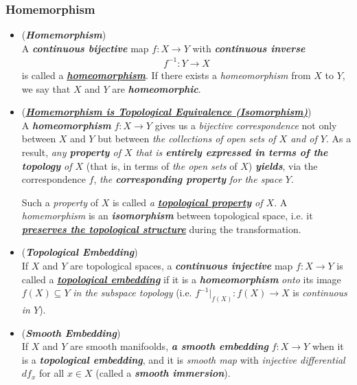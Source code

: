 \documentclass[11pt]{article}
\begin{document}
\subsubsection{Homemorphism}
\begin{itemize}
\item \begin{definition} (\textbf{\emph{Homemorphism}})\\
A \emph{\textbf{continuous bijective}} map $f: X \rightarrow Y$ with \emph{\textbf{continuous inverse}} 
\begin{align*}
f^{-1}: Y \rightarrow X
\end{align*}
is called a \underline{\emph{\textbf{homeomorphism}}}. If there exists a \emph{homeomorphism} from $X$ to $Y$, we say that $X$ and $Y$ are \emph{\textbf{homeomorphic}}.
\end{definition}

\item  \begin{remark} (\underline{\emph{\textbf{Homemorphism is Topological Equivalence (Isomorphism)}}})\\
A \emph{\textbf{homeomorphism}} $f : X \rightarrow Y$ gives us a \emph{bijective  correspondence} not only between $X$ and $Y$ but between \emph{the collections of open sets of $X$ and of $Y$}. As a result, \emph{any \textbf{property} of $X$ that is \textbf{entirely expressed in terms of the  topology} of $X$} (that is, in terms of \emph{the open sets} of $X$) \emph{\textbf{yields}}, via the correspondence $f$, \emph{the \textbf{corresponding property} for the space} $Y$. 

Such a \emph{property} of $X$ is called \emph{a \underline{\textbf{topological property}} of $X$}. A \emph{homemorphism} is an \emph{\textbf{isomorphism}} between topological space, i.e. it \underline{\emph{\textbf{preserves the topological structure}}} during the transformation.
\end{remark}



\item \begin{definition} (\emph{\textbf{Topological Embedding}})\\
If $X$ and $Y$ are topological spaces, a \emph{\textbf{continuous injective}} map $f: X \rightarrow Y$ is called a \underline{\emph{\textbf{topological embedding}}} if it is a \emph{\textbf{homeomorphism}} \emph{onto} its image $f(X) \subseteq Y$ \emph{in the subspace topology} (i.e. $f^{-1}|_{f(X)}: f(X) \rightarrow X$ is \emph{continuous in $Y$}).
\end{definition}

\item \begin{remark}(\emph{\textbf{Smooth Embedding}})\\
If $X$ and $Y$ are smooth manifoolds, \emph{\textbf{a smooth embedding}} $f: X \rightarrow Y$ when it is a \textbf{\emph{topological embedding}}, and it is \emph{smooth map} with \emph{injective differential} $df_{x}$ for all $x \in X$ (called a \emph{\textbf{smooth immersion}}).
\end{remark}
\end{itemize}
\end{document}
